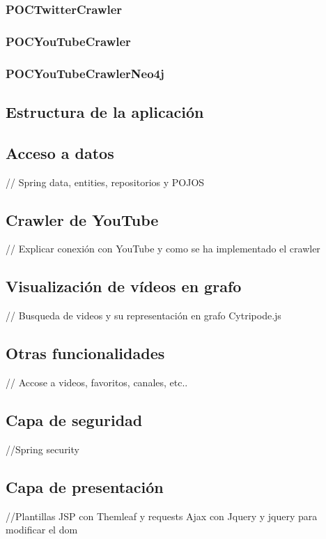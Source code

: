 \documentclass[11pt,a4paper]{article}
\begin{document}
\subsubsection{POCTwitterCrawler}
\subsubsection{POCYouTubeCrawler}
\subsubsection{POCYouTubeCrawlerNeo4j}

\subsection{Estructura de la aplicación}

\subsection{Acceso a datos}
// Spring data, entities, repositorios y POJOS

\subsection{Crawler de YouTube}
// Explicar conexión con YouTube y como se ha implementado el crawler

\subsection{Visualización de vídeos en grafo}
// Busqueda de videos y su representación en grafo Cytripode.js

\subsection{Otras funcionalidades}
// Accose a videos, favoritos, canales, etc.. 

\subsection{Capa de seguridad}
//Spring security

\subsection{Capa de presentación}
//Plantillas JSP con Themleaf y requests Ajax con Jquery y jquery para modificar el dom
\end{document}
